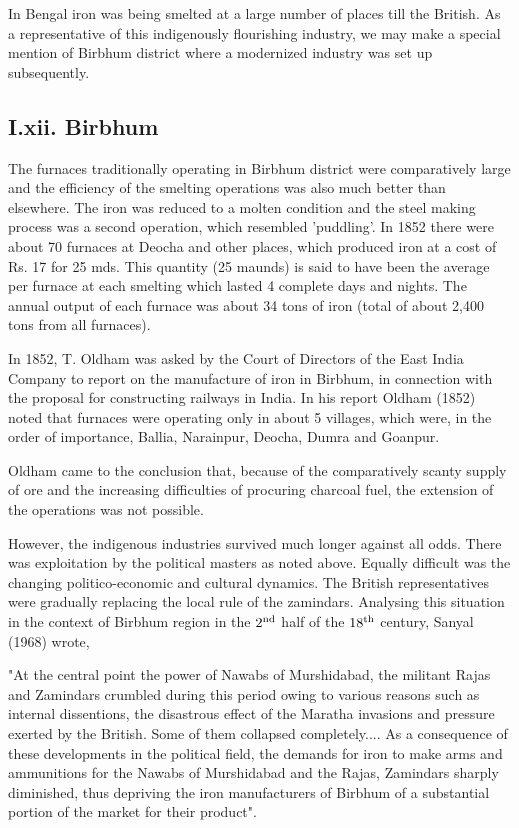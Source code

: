 In Bengal iron was being smelted at a large number of places till the British. As a representative of this indigenously flourishing industry, we may make a special mention of Birbhum district where a modernized industry was set up subsequently.

\subsection*{I.xii. Birbhum}\label{subsection-12}

The furnaces traditionally operating in Birbhum district were comparatively large and the efficiency of the smelting operations was also much better than elsewhere.  The iron was reduced to a molten condition and the steel making process was a second operation, which resembled 'puddling'.  In 1852 there were about 70 furnaces at Deocha and other places, which produced iron at a cost of Rs. 17 for 25 mds.  This quantity (25 maunds) is said to have been the average per furnace at each smelting which lasted 4 complete days and nights.   The annual output of each furnace was about 34 tons of iron (total of about 2,400 tons from all furnaces).

In 1852, T. Oldham was asked by the Court of Directors of the East India Company to report on the manufacture of iron in Birbhum, in connection with the proposal for constructing railways in India. In his report Oldham (1852) noted that furnaces were operating only in about 5 villages, which were, in the order of importance, Ballia, Narainpur, Deocha, Dumra and Goanpur.

Oldham came to the conclusion that, because of the comparatively scanty supply of ore and the increasing difficulties of procuring charcoal fuel, the extension of the operations was not possible.

However, the indigenous industries survived much longer against all odds.  There was exploitation by the political masters as noted above.  Equally difficult was the changing politico-economic and cultural dynamics.  The British representatives were gradually replacing the local rule of the zamindars.  Analysing this situation in the context of Birbhum region in the $2^{\rm nd}$ half of the $18^{\rm th}$ century, Sanyal (1968) wrote, 

"At the central point the power of Nawabs of Murshidabad, the militant Rajas and Zamindars crumbled during this period owing to various reasons such as internal dissentions, the disastrous effect of the Maratha invasions and pressure exerted by the British.  Some of them collapsed completely.... As a consequence of these developments in the political field, the demands for iron to make arms and ammunitions for the Nawabs of Murshidabad and the Rajas, Zamindars sharply diminished, thus depriving the iron manufacturers of Birbhum of a substantial portion of the market for their product".  

